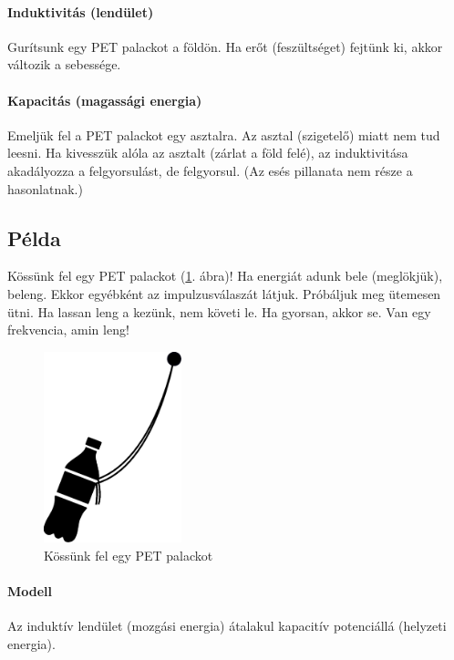 \documentclass[12pt,a4paper]{article}
\begin{document}
\paragraph{Induktivitás (lendület)} Gurítsunk egy PET palackot a földön. Ha erőt (feszültséget) fejtünk ki, akkor változik a sebessége.

\paragraph{Kapacitás (magassági energia)} Emeljük fel a PET palackot egy asztalra. Az asztal (szigetelő) miatt nem tud leesni. Ha kivesszük alóla az asztalt (zárlat a föld felé), az induktivitása akadályozza a felgyorsulást, de felgyorsul. (Az esés pillanata nem része a hasonlatnak.)

\subsection{Példa}


Kössünk fel egy PET palackot (\ref{fig:palack}. ábra)! Ha energiát adunk bele (meglökjük), beleng. Ekkor egyébként az impulzusválaszát látjuk. Próbáljuk meg ütemesen ütni. Ha lassan leng a kezünk, nem követi le. Ha gyorsan, akkor se. Van egy frekvencia, amin leng!


\begin{figure}[H]
\begin{center}
\includegraphics[width=4cm]{figures/szurok_palack.eps}
\caption{Kössünk fel egy PET palackot}
\label{fig:palack}
\end{center}
\end{figure}

\paragraph{Modell} Az induktív lendület (mozgási energia) átalakul kapacitív potenciállá (helyzeti energia).
\end{document}
